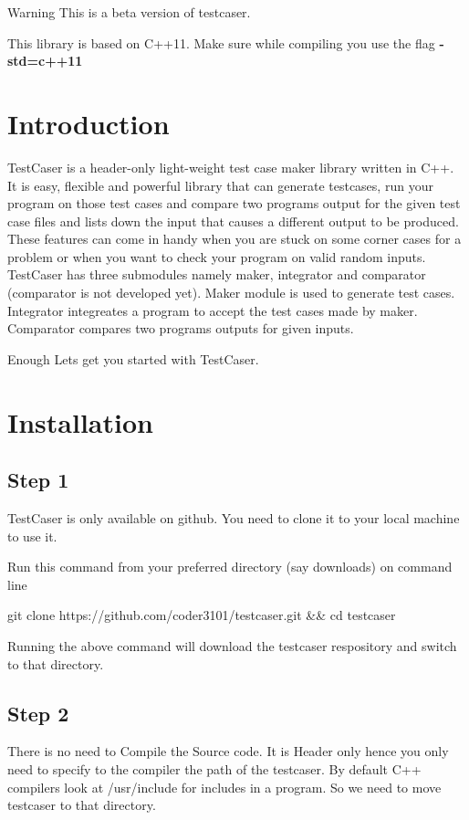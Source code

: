\begin{DoxyWarning}{Warning}
This is a beta version of testcaser.

This library is based on C++11. Make sure while compiling you use the flag {\bfseries -\/std=c++11}
\end{DoxyWarning}
\hypertarget{index_sec_intro}{}\section{Introduction}\label{index_sec_intro}
Test\+Caser is a header-\/only light-\/weight test case maker library written in C++. It is easy, flexible and powerful library that can generate testcases, run your program on those test cases and compare two program\textquotesingle{}s output for the given test case files and lists down the input that causes a different output to be produced. These features can come in handy when you are stuck on some corner cases for a problem or when you want to check your program on valid random inputs. Test\+Caser has three submodules namely maker, integrator and comparator (comparator is not developed yet). Maker module is used to generate test cases. Integrator integreates a program to accept the test cases made by maker. Comparator compares two program\textquotesingle{}s outputs for given inputs.

Enough Let\textquotesingle{}s get you started with Test\+Caser. 

\hypertarget{index_sec_install}{}\section{Installation}\label{index_sec_install}
\hypertarget{index_step1}{}\subsection{Step 1}\label{index_step1}
Test\+Caser is only available on github. You need to clone it to your local machine to use it.

Run this command from your preferred directory (say downloads) on command line 
\begin{DoxyCode}
git clone https://github.com/coder3101/testcaser.git && cd testcaser
\end{DoxyCode}
 Running the above command will download the testcaser respository and switch to that directory.\hypertarget{index_step2}{}\subsection{Step 2}\label{index_step2}
There is no need to Compile the Source code. It is Header only hence you only need to specify to the compiler the path of the testcaser. By default C++ compilers look at {\ttfamily /usr/include} for includes in a program. So we need to move testcaser to that directory.

